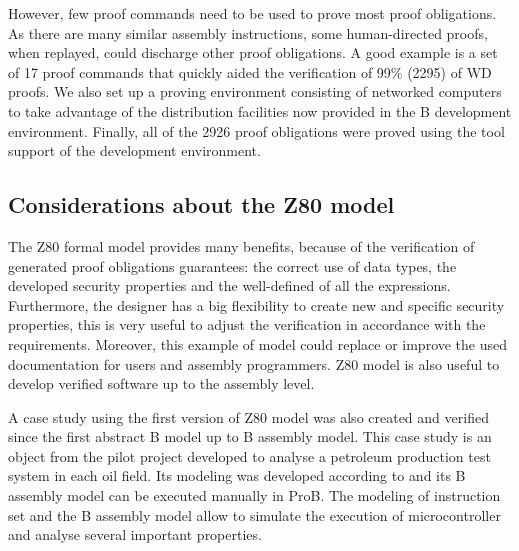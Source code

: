 \documentclass[a4paper]{llncs}
\begin{document}
However, few proof commands need to be used to prove most proof obligations. As there are many similar assembly instructions,
some human-directed proofs, when replayed, could discharge other proof
obligations. A good example is a set of 17 proof commands that quickly aided the
verification of 99\% (2295) of WD proofs. We also set up a proving environment
consisting of networked computers to take advantage of the distribution
facilities now provided in the B development environment. Finally, all of the
2926 proof obligations were proved using the tool support of the development
environment.




\subsection{Considerations about the Z80 model}


The Z80 formal model provides many benefits, because of the verification of
generated proof obligations guarantees: the correct use of data types, the developed
security properties  and the well-defined of all the expressions. 
Furthermore, the designer has a big flexibility to create new and specific security properties, this is very useful %
to adjust the verification in accordance with the requirements. Moreover, this
example of model could replace or improve the used documentation for users and
assembly programmers. Z80 model is also useful to develop verified software 
up to the assembly level.



A case study using the first version of Z80 model was also created and verified
since the first abstract B model up to B assembly model. This case study is an
object from the pilot project developed to analyse a petroleum production test
system in each oil field. Its modeling was developed according to \cite{LAUT_SERGIO}
and its B assembly model can be executed manually in ProB. The modeling of
instruction set and the B assembly model allow to simulate the execution of microcontroller
and analyse several important properties.





 
\end{document}
